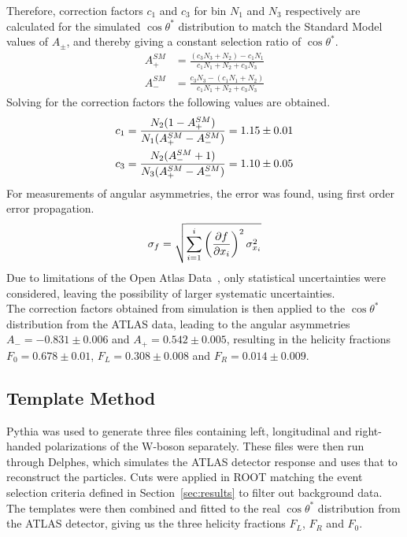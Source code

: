 \documentclass[12pt,a4paper]{article}
\numberwithin{equation}{section}
\begin{document}
Therefore, correction factors $c_1$ and $c_3$ for bin $N_1$ and $N_3$
respectively are calculated for the simulated $\cos\theta^*$ distribution to match
the Standard Model values of $A_{\pm}$, and thereby giving a constant selection ratio of $\cos\theta^*$.
\begin{align}
	A_{+}^{SM} &= \frac{(c_3N_3 + N_2) - c_1N_1}{c_1N_1 + N_2 + c_3N_3} \\
	A_{-}^{SM} &= \frac{c_3N_3 - (c_1N_1 + N_2)}{c_1N_1 + N_2 + c_3N_3}
\end{align}
Solving for the correction factors the following values are obtained.
\begin{align} \label{eq:correction}
	c_1 &= \frac{N_2(1-A_{+}^{SM})}{N_1(A_{+}^{SM} -A_{-}^{SM})} = \num{1.15 +- 0.01}  \\
	c_3 &= \frac{N_2(A_{-}^{SM}+1)}{N_3(A_{+}^{SM}-A_{-}^{SM})} = \num{1.10 +- 0.05}
\end{align}
For measurements of angular asymmetries, the error was found, using first order
error propagation.
\begin{align}
	\sigma_{f} = \sqrt{\sum_{i=1}^{i}\left(\pdv{f}{x_i}\right)^2\sigma_{x_i}^2}
\end{align}
Due to limitations of the Open Atlas Data~\cite{oreach2020}, only statistical uncertainties were considered, leaving the possibility of larger systematic uncertainties. \\

The correction factors obtained from simulation is then applied to the
$\cos\theta^{*}$ distribution from the ATLAS data, leading to the angular asymmetries $A_- = -0.831 \pm 0.006$ and
$A_+ = 0.542 \pm 0.005$, resulting in the helicity fractions
$F_0=0.678 \pm 0.01$, $F_L=0.308 \pm 0.008$ and $F_R=0.014 \pm 0.009$.




\subsection{Template Method}
Pythia was used to generate three files containing left, longitudinal and
right-handed polarizations of the W-boson separately. These files were then run
through Delphes, which simulates the ATLAS detector response and uses that to
reconstruct the particles. Cuts were applied in ROOT matching the event
selection criteria defined in Section~\ref{sec:results} to filter out background
data. The templates were then combined and fitted to the real $\cos \theta^{*}$
distribution from the ATLAS detector, giving us the three helicity fractions
$F_L$, $F_R$ and $F_0$.
\end{document}
